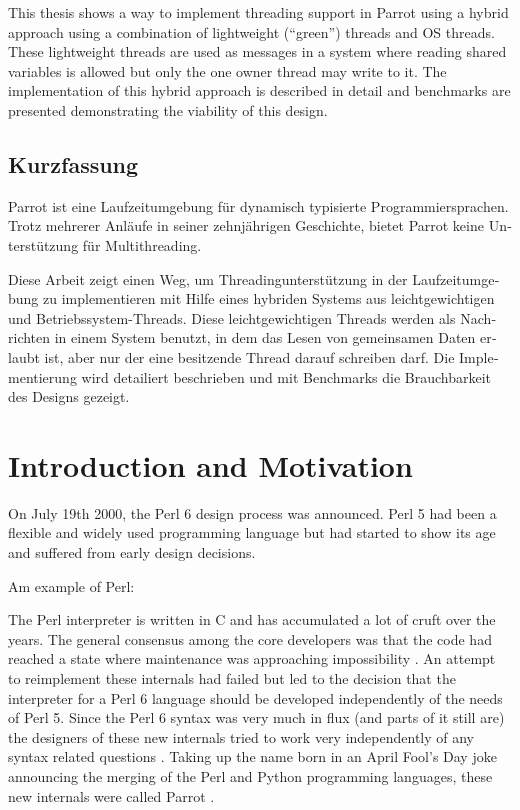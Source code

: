 \documentclass[bachelor,english]{hgbthesis}
\begin{document}
This thesis shows a way to implement threading support in Parrot using a hybrid approach using a combination of lightweight (``green'') threads and OS threads. These lightweight threads are used as messages in a system where reading shared variables is allowed but only the one owner thread may write to it. The implementation of this hybrid approach is described in detail and benchmarks are presented demonstrating the viability of this design.

\begin{german}
\chapter{Kurzfassung}

Parrot ist eine Laufzeitumgebung f{\"u}r dynamisch typisierte Programmiersprachen. Trotz mehrerer Anl{\"a}ufe in seiner zehnj{\"a}hrigen Geschichte, bietet Parrot keine Unterst{\"u}tzung f{\"u}r Multithreading.

Diese Arbeit zeigt einen Weg, um Threadingunterst{\"u}tzung in der Laufzeitumgebung zu implementieren mit Hilfe eines hybriden Systems aus leichtgewichtigen und Betriebssystem-Threads. Diese leichtgewichtigen Threads werden als Nachrichten in einem System benutzt, in dem das Lesen von gemeinsamen Daten erlaubt ist, aber nur der eine besitzende Thread darauf schreiben darf. Die Implementierung wird detailiert beschrieben und mit Benchmarks die Brauchbarkeit des Designs gezeigt.

\end{german}

\mainmatter

\chapter{Introduction and Motivation}

%
On July 19th 2000, the Perl 6 design process was announced. Perl 5 had been a flexible and widely used programming language but had started to show its age and suffered from early design decisions.

Am example of Perl:


The Perl interpreter is written in C and has accumulated a lot of cruft over the years. The general consensus among the core developers was that the code had reached a state where maintenance was approaching impossibility \cite{Masak40451}. An attempt to reimplement these internals had failed but led to the decision that the interpreter for a Perl 6 language should be developed independently of the needs of Perl 5. Since the Perl 6 syntax was very much in flux (and parts of it still are) the designers of these new internals tried to work very independently of any syntax related questions \cite{Developer}. Taking up the name born in an April Fool's Day joke announcing the merging of the Perl and Python programming languages, these new internals were called Parrot \cite{Perl}.
\end{document}
